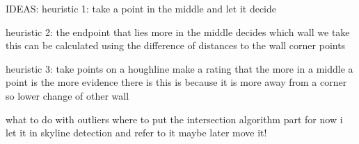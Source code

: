 IDEAS:
heuristic 1:
take a point in the middle and let it decide

heuristic 2:
the endpoint that lies more in the middle decides which wall we take
this can be calculated using the difference of distances to the wall corner points

heuristic 3:
take points on a houghline
make a rating that the more in a middle a point is the more evidence there is
this is because it is more away from a corner so lower change of other wall


what to do with outliers
where to put the intersection algorithm part
for now i let it in skyline detection and refer to it
maybe later move it!



